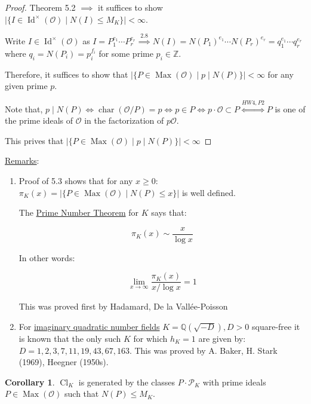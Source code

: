 \documentclass[openany]{amsbook}
\numberwithin{section}{chapter}
\theoremstyle{definition}
\newtheorem{corollary}[theorem]{Corollary}
\begin{document}
\begin{proof}
    Theorem 5.2 \(\implies\) it suffices to show \(\vert \{ I \in \operatorname{Id}^\times (\mathcal{O}) \mid N(I) \leq M_K \}  \vert < \infty \).

    Write \(I \in \operatorname{Id}^\times (\mathcal{O})\) as \(I = P_1^{e_1}\cdots P_r^{e_r} \overset{2.8}{\implies} N(I) = N(P_1)^{e_1}\cdots N(P_r)^{e_r} = q_1^{e_1}\cdots q_r^{e_r}\) where \(q_i = N(P_i) = p_i^{f_i}\) for some prime \(p_i \in \mathbb{Z}\).
    
    Therefore, it suffices to show that \(\vert \{ P \in \operatorname{Max}(\mathcal{O}) \mid p \mid N(P) \}  \vert  < \infty\) for any given prime \(p\).
    
    Note that, \(p\mid N(P) \iff \operatorname{char}(\mathcal{O} / P) = p \iff p\in P \iff p \cdot \mathcal{O} \subset P \overset{HW4, P2}{\iff} P \) is one of the prime ideals of \(\mathcal{O}\) in the factorization of \(p \mathcal{O}\).
    
    This prives that \(\vert \{ P\in \operatorname{Max}(\mathcal{O}) \mid p \mid N(P) \} \vert < \infty \) 
\end{proof}

\underline{Remarks}: 

\begin{enumerate}[label=\arabic*)]
    \item Proof of 5.3 shows that for any \(x \geq 0\): \(\pi_K(x) = \vert \{ P\in \operatorname{Max} (\mathcal{O} ) \mid N(P) \leq x \}  \vert \) is well defined. 
    
    The \underline{Prime Number Theorem} for \(K\) says that:

    \[
        \pi_K(x) \sim \frac{x}{\log x}
    \]

    In other words:

    \[
        \lim_{x \to \infty} \frac{\pi_K(x)}{x / \log  x} = 1
    \]

    This was proved first by Hadamard, De la Vall\'ee-Poisson

    \item For \underline{imaginary quadratic number fields} \(K = \mathbb{Q}(\sqrt{-D}), D > 0\) square-free it is known that the only such \(K\) for which \(h_K = 1\) are given by: \(D = 1,2,3,7,11,19,43,67,163\). This was proved by A. Baker, H. Stark (1969), Heegner (1950s). 
 
\end{enumerate} 

\begin{corollary}
    \(\operatorname{Cl}_K\) is generated by the classes \(P \cdot \mathcal{P}_K\) with prime ideals \(P\in \operatorname{Max}(\mathcal{O})\) such that \(N(P) \leq M_K\).
\end{corollary}
\end{document}
